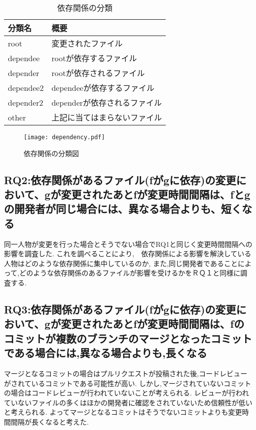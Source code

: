 \documentclass{fose2016}           %
\begin{document}
\begin{table}
\caption{依存関係の分類}
\begin{tabular}{|l|l|} \hline
分類名 & 概要 \\ \hline
root & 変更されたファイル \\ \hline
dependee & rootが依存するファイル \\ \hline
depender & rootが依存されるファイル \\ \hline
dependee2 & dependeeが依存するファイル \\ \hline
depender2 & dependerが依存されるファイル \\ \hline
other & 上記に当てはまらないファイル \\ \hline
\end{tabular}
\label{tab:依存関係の分類}
\end{table}

\begin{figure}[t]
\centering
\texttt{[image: dependency.pdf]}
\caption{依存関係の分類図}
\label{fig:dependency} 
\end{figure}

\subsection{RQ2:依存関係があるファイル(fがgに依存)の変更において、gが変更されたあとfが変更時間間隔は、fとgの開発者が同じ場合には、異なる場合よりも、短くなる}
同一人物が変更を行った場合とそうでない場合でRQ1と同じく変更時間間隔への影響を調査した.
これを調べることにより,　依存関係による影響を解決している人物はどのような依存関係に集中しているのか,
また,同じ開発者であることによって,どのような依存関係のあるファイルが影響を受けるかをＲＱ１と同様に調査する.

\subsection{RQ3:依存関係があるファイル(fがgに依存)の変更において、gが変更されたあとfが変更時間間隔は、fのコミットが複数のブランチのマージとなったコミットである場合には,異なる場合よりも,長くなる}
マージとなるコミットの場合はプルリクエストが投稿された後,コードレビューがされているコミットである可能性が高い.
しかし,マージされていないコミットの場合はコードレビューが行われていないことが考えられる.
レビューが行われていないファイルの多くはほかの開発者に確認をされていないため信頼性が低いと考えられる.
よってマージとなるコミットはそうでないコミットよりも変更時間間隔が長くなると考えた.
\end{document}
